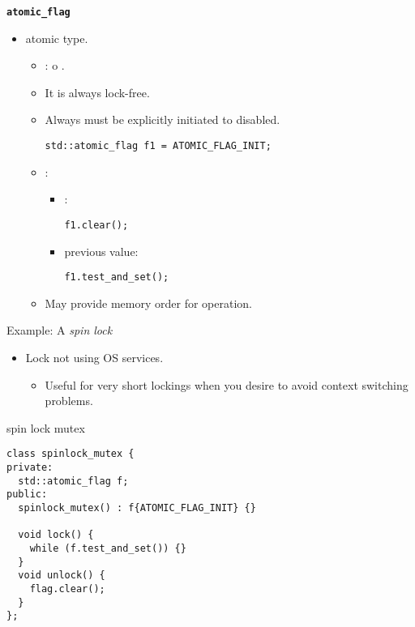\begin{frame}[t,fragile]{\texttt{\textbf{atomic\_flag}}}
\begin{itemize}
  \item {} atomic type.
    \begin{itemize}
      \item {}:  o .
      \item It is always lock-free.

      \item Always must be explicitly initiated to disabled.
\begin{lstlisting}
std::atomic_flag f1 = ATOMIC_FLAG_INIT;
\end{lstlisting}

      \item {}:
        \begin{itemize}
          \item {}: 
\begin{lstlisting}
f1.clear();
\end{lstlisting}
          \item {} previous value: 
\begin{lstlisting}
f1.test_and_set();
\end{lstlisting}
        \end{itemize}
      \item May provide memory order for operation.
    \end{itemize}
\end{itemize}
\end{frame}

\begin{frame}[t,fragile]{Example: A \emph{spin lock}}
\begin{itemize}
  \item Lock not using OS services.
    \begin{itemize}
      \item Useful for very short lockings when you desire to avoid context switching problems.
    \end{itemize}
\end{itemize}
\begin{block}{spin lock mutex}
\begin{lstlisting}[basicstyle=\tiny]
class spinlock_mutex {
private:
  std::atomic_flag f;
public:
  spinlock_mutex() : f{ATOMIC_FLAG_INIT} {}

  void lock() {
    while (f.test_and_set()) {}
  }
  void unlock() {
    flag.clear();
  }
};
\end{lstlisting}
\end{block}
\end{frame}

